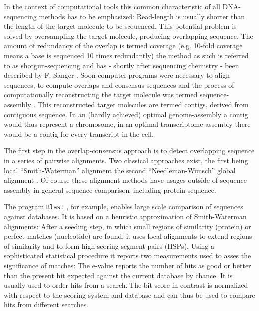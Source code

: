 In the context of computational tools this common characteristic of
all DNA-sequencing methods has to be emphasized: Read-length is
usually shorter than the length of the target molecule to be
sequenced. This potential problem is solved by oversampling the target
molecule, producing overlapping sequence. The amount of redundancy of
the overlap is termed coverage (e.g. 10-fold coverage means a base is
sequenced 10 times redundantly) the method as such is referred to as
shotgun-sequencing and has - shortly after sequencing chemistry - been
described by F. Sanger \cite{pmid6260957}. Soon computer programs were
necessary to align sequences, to compute overlaps and consensus
sequences \cite{pmid461197} and the process of computationally
reconstructing the target molecule was termed sequence-assembly
\cite{pmid6251542}. This reconstructed target molecules are termed
contigs, derived from contiguous sequence. In an (hardly achieved)
optimal genome-assembly a contig would thus represent a chromosome, in
an optimal transcriptome assembly there would be a contig for every
transcript in the cell.

The first step in the overlap-consensus approach is to detect
overlapping sequence in a series of pairwise alignments. Two classical
approaches exist, the first being local ``Smith-Waterman'' alignment
\cite{pmid7265238} the second ``Needleman-Wunsch'' global alignment
\cite{pmid7334527}. Of course these alignment methods have usages
outside of sequence assembly in general sequence comparison, including
protein sequence.

The program \texttt{Blast} \cite{pmid2231712}, for example, enables
large scale comparison of sequences against databases. It is based on
a heuristic approximation of Smith-Waterman alignments: After a
seeding step, in which small regions of similarity (protein) or
perfect matches (nucleotide) are found, it uses local-alignments to
extend regions of similarity and to form high-scoring segment pairs
(HSPs). Using a sophisticated statistical procedure it reports two
measurements used to asses the significance of matches: The e-value
reports the number of hits as good or better than the present hit
expected against the current database by chance. It is usually used to
order hits from a search. The bit-score in contrast is normalized with
respect to the scoring system and database and can thus be used to
compare hits from different searches.

